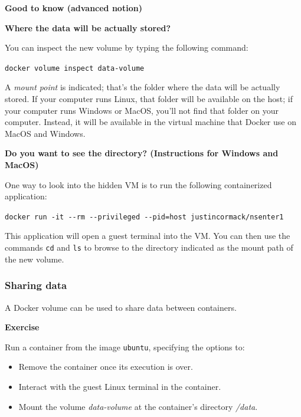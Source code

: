 \documentclass[
]{article}
\providecommand{\tightlist}{%
  \setlength{\itemsep}{0pt}\setlength{\parskip}{0pt}}
\newenvironment{infobox}[1]
  {
  \begin{itemize}
  \renewcommand{\labelitemi}{
    \raisebox{-.7\height}[0pt][0pt]{
      
    }
  }
  \setlength{\fboxsep}{1em}
  \begin{whitebox}
  \item
  }
  {
  \end{whitebox}
  \end{itemize}
  }
\theoremstyle{definition}
\theoremstyle{definition}
\theoremstyle{definition}
\theoremstyle{remark}
\let\BeginKnitrBlock\begin \let\EndKnitrBlock\end
\begin{document}
\begin{infobox}{curiosity}
\textbf{Good to know (advanced notion)}

\textbf{Where the data will be actually stored?}

You can inspect the new volume by typing the
following command:

\texttt{docker\ volume\ inspect\ data-volume}

A \emph{mount point} is indicated; that's the folder where the data
will be actually stored.
If your computer runs Linux, that folder will be available
on the host; if your computer runs Windows or MacOS,
you'll not find that folder on your computer.
Instead, it will be available in the virtual machine
that Docker use on MacOS and Windows.

\textbf{Do you want to see the directory? (Instructions for Windows and MacOS)}

One way to look into the hidden VM is to run
the following containerized application:

\texttt{docker\ run\ -it\ -\/-rm\ -\/-privileged\ -\/-pid=host\ justincormack/nsenter1}

This application will open a guest terminal into the VM.
You can then use the commands \texttt{cd} and \texttt{ls}
to browse to the directory indicated as the mount path
of the new volume.

\end{infobox}

\subsubsection{Sharing data}\label{sharing-data}

A Docker volume can be used to share data between containers.

\begin{infobox}{exercisebox}

\textbf{Exercise}

\BeginKnitrBlock{exercise}
\label{exr:unnamed-chunk-26}{\label{exr:unnamed-chunk-26} }Run a container from the image \texttt{ubuntu},
specifying the options to:

\begin{itemize}
\item
  Remove the container once its execution is over.
\item
  Interact with the guest Linux terminal in the container.
\end{itemize}

\begin{itemize}
\tightlist
\item
  Mount the volume \emph{data-volume} at the container's directory \emph{/data}.
\end{itemize}
\EndKnitrBlock{exercise}

\end{infobox}
\end{document}
